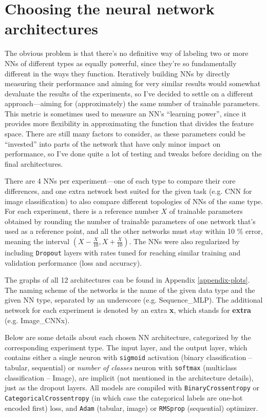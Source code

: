 \section{Choosing the neural network architectures}
\label{choosing-the-neural-network-architectures}
The obvious problem is that there's no definitive way of labeling two or more NNs of different
types as equally powerful, since they're so fundamentally different in the ways they function.
Iteratively building NNs by directly measuring their performance and aiming for very similar results would somewhat
devaluate the results of the experiments, so I've decided to settle on a different approach---aiming
for (approximately) the same number of trainable parameters. This metric is sometimes used to measure an NN's
``learning power'', since it provides more flexibility in approximating the function that divides the feature space.
There are still many factors to consider,
as these parameters could be ``invested'' into parts of the network that have only minor impact on performance,
so I've done quite a lot of testing and tweaks before deciding on the final architectures.

There are 4 NNs per experiment---one of each type to compare their core differences, and one
extra network best suited for the given task (e.g. CNN for image classification) to also compare different
topologies of NNs of the same type. For each experiment, there is a reference number $X$ of trainable parameters
obtained by rounding the number of trainable parameters of one network that's used as a reference point,
and all the other networks must stay within 10 \% error, meaning the interval $(X - \frac{X}{10}, X + \frac{X}{10})$.
The NNs were also regularized by including \texttt{Dropout} layers with rates tuned for reaching similar
training and validation performance (loss and accuracy).

The graphs of all 12 architectures can be found in Appendix \ref{appendix-plots}.
The naming scheme of the networks is the name of the given data type and the given NN type,
separated by an underscore
(e.g. Sequence\_MLP). The additional network for each experiment is denoted by an extra \textbf{x},
which stands for \textbf{extra} (e.g. Image\_CNNx).

Below are some details about each chosen NN architecture, categorized by the corresponding experiment type.
The input layer, and the output layer, which contains either a single neuron with \texttt{sigmoid} activation
(binary classification -- tabular, sequential) or \textit{number of classes} neuron with \texttt{softmax}
(multiclass classification -- Image), are implicit (not mentioned in the architecture details),
just as the dropout layers.
All models are compiled with \texttt{BinaryCrossentropy} or \texttt{CategoricalCrossentropy}
(in which case the categorical labels are one-hot encoded first) loss, and \texttt{Adam} (tabular, image)
or \texttt{RMSprop} (sequential) optimizer.


